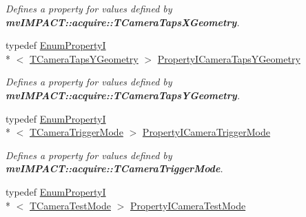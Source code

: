 \begin{DoxyCompactItemize}
\begin{DoxyCompactList}\small\item\em Defines a property for values defined by {\bfseries mv\+I\+M\+P\+A\+C\+T\+::acquire\+::\+T\+Camera\+Taps\+X\+Geometry}. \end{DoxyCompactList}\item 
\hypertarget{group___device_specific_interface_ga8ca68a8fc0e8c81dacb76b2cfc289909}{typedef \hyperlink{classmv_i_m_p_a_c_t_1_1acquire_1_1_enum_property_i}{Enum\+Property\+I}\\*
$<$ \hyperlink{group___device_specific_interface_ga03c8b70bb46d82e4f9f4a8c154d7261c}{T\+Camera\+Taps\+Y\+Geometry} $>$ \hyperlink{group___device_specific_interface_ga8ca68a8fc0e8c81dacb76b2cfc289909}{Property\+I\+Camera\+Taps\+Y\+Geometry}}\label{group___device_specific_interface_ga8ca68a8fc0e8c81dacb76b2cfc289909}

\begin{DoxyCompactList}\small\item\em Defines a property for values defined by {\bfseries mv\+I\+M\+P\+A\+C\+T\+::acquire\+::\+T\+Camera\+Taps\+Y\+Geometry}. \end{DoxyCompactList}\item 
\hypertarget{group___device_specific_interface_gad47fbc49f6f36b45b3458aef7a61849a}{typedef \hyperlink{classmv_i_m_p_a_c_t_1_1acquire_1_1_enum_property_i}{Enum\+Property\+I}\\*
$<$ \hyperlink{group___device_specific_interface_ga7d880247a3af52241ce96ba703c526a1}{T\+Camera\+Trigger\+Mode} $>$ \hyperlink{group___device_specific_interface_gad47fbc49f6f36b45b3458aef7a61849a}{Property\+I\+Camera\+Trigger\+Mode}}\label{group___device_specific_interface_gad47fbc49f6f36b45b3458aef7a61849a}

\begin{DoxyCompactList}\small\item\em Defines a property for values defined by {\bfseries mv\+I\+M\+P\+A\+C\+T\+::acquire\+::\+T\+Camera\+Trigger\+Mode}. \end{DoxyCompactList}\item 
\hypertarget{group___device_specific_interface_gac0b281150a89dd23bb2a696aba431225}{typedef \hyperlink{classmv_i_m_p_a_c_t_1_1acquire_1_1_enum_property_i}{Enum\+Property\+I}\\*
$<$ \hyperlink{group___device_specific_interface_ga6e439707d908a0a14e9df8e190df76aa}{T\+Camera\+Test\+Mode} $>$ \hyperlink{group___device_specific_interface_gac0b281150a89dd23bb2a696aba431225}{Property\+I\+Camera\+Test\+Mode}}\label{group___device_specific_interface_gac0b281150a89dd23bb2a696aba431225}


\end{DoxyCompactItemize}
